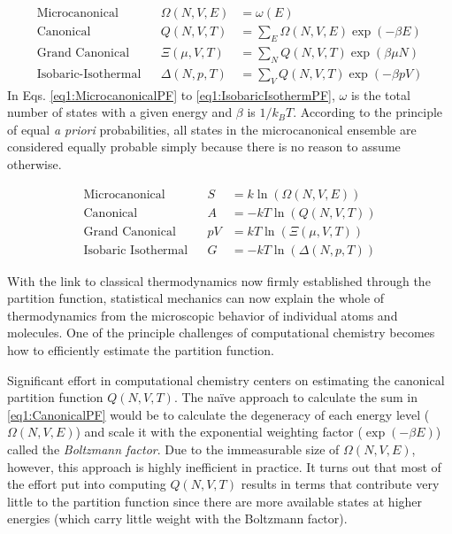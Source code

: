 \begin{align}
   \text{Microcanonical} && \Omega(N, V, E) & = \omega(E) 
      \label{eq1:MicrocanonicalPF} \\
   \text{Canonical} && Q(N, V, T) & = \sum_E \Omega(N, V, E) 
               \exp(-\beta E) 
               \label{eq1:CanonicalPF} \\
   \text{Grand Canonical} && \Xi(\mu, V, T) & = \sum _ N 
               Q(N, V, T) \exp(\beta \mu N) 
               \label{eq1:GrandCanonicalPF} \\
   \text{Isobaric-Isothermal} && \Delta(N, p, T) & = \sum _ V
               Q(N, V, T) \exp(-\beta p V)
               \label{eq1:IsobaricIsothermPF}
\end{align}
In Eqs. \ref{eq1:MicrocanonicalPF} to \ref{eq1:IsobaricIsothermPF}, $\omega$ is
the total number of states with a given energy and $\beta$ is $1 / k_BT$.
According to the principle of equal \emph{a priori} probabilities, all states in
the microcanonical ensemble are considered equally probable simply because there
is no reason to assume otherwise.

\begin{align}
   \text{Microcanonical} && S & = k \ln \left ( \Omega (N, V, E) \right ) 
      \label{eq1:ThermoLink1} \\
   \text{Canonical} && A & = -kT \ln \left ( Q (N, V, T) \right ) 
      \label{eq1:ThermoLink2} \\
   \text{Grand Canonical} && p V & = kT \ln \left ( \Xi (\mu, V, T) \right ) 
      \label{eq1:ThermoLink3} \\
   \text{Isobaric Isothermal} && G & = - kT \ln \left ( \Delta (N, p, T) \right )
      \label{eq1:ThermoLink4}
\end{align}

With the link to classical thermodynamics now firmly established through the
partition function, statistical mechanics can now explain the whole of
thermodynamics from the microscopic behavior of individual atoms and molecules.
One of the principle challenges of computational chemistry becomes how to
efficiently estimate the partition function.

Significant effort in computational chemistry centers on estimating the
canonical partition function $Q(N, V, T)$. The na\"ive approach to calculate the
sum in \ref{eq1:CanonicalPF} would be to calculate the degeneracy of each energy
level ($\Omega(N, V, E)$) and scale it with the exponential weighting factor
($\exp(-\beta E)$) called the \emph{Boltzmann factor}. Due to the immeasurable
size of $\Omega(N, V, E)$, however, this approach is highly inefficient in
practice. It turns out that most of the effort put into computing $Q(N, V, T)$
results in terms that contribute very little to the partition function since
there are more available states at higher energies (which carry little weight
with the Boltzmann factor).

